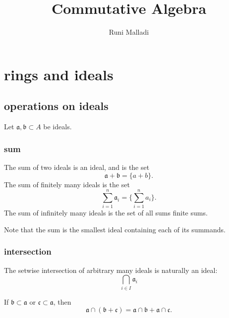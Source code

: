 \documentclass[12pt]{article}
\title{Commutative Algebra}
\author{Runi Malladi}
\begin{document}
\maketitle

\tableofcontents

\section{rings and ideals} %

\subsection{operations on ideals} %

Let $\mathfrak{a},\mathfrak{b}\subset A$ be ideals.

\subsubsection{sum}

The sum of two ideals is an ideal, and is the set 
\begin{equation*}
	\mathfrak{a}+\mathfrak{b} = \{ a + b \}.
\end{equation*}
The sum of finitely many ideals is the set 
\begin{equation*}
	\sum_{i=1}^n \mathfrak{a}_i = \{ \sum_{i=1}^n a_i \}.
\end{equation*}
The sum of infinitely many ideals is the set of all sums finite sums.

Note that the sum is the smallest ideal containing each of its summands.

\subsubsection{intersection}

The setwise intersection of arbitrary many ideals is naturally an ideal:
\begin{equation*}
	\bigcap_{i\in I}\mathfrak{a}_i
\end{equation*}

\begin{proposition}
	If $\mathfrak{b}\subset\mathfrak{a}$ or $\mathfrak{c}\subset \mathfrak{a}$, then 
	\begin{equation*}
		\mathfrak{a} \cap (\mathfrak{b} + \mathfrak{c}) = \mathfrak{a}\cap\mathfrak{b} + \mathfrak{a}\cap\mathfrak{c}.
	\end{equation*}
\end{proposition}
\end{document}
